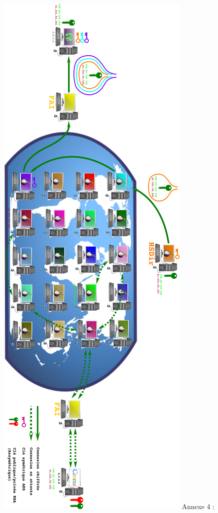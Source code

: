 \documentclass[]{article}
\begin{document}
\includegraphics{images/Telechargement_Descripteur.png} Annexe 4 :
\end{document}
